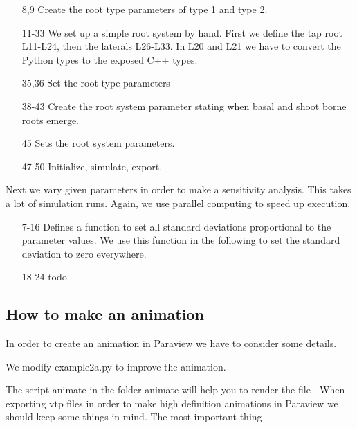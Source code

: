 \documentclass[a4paper]{article}
\begin{document}
\begin{itemize}

\item[8,9] Create the root type parameters of type 1 and type 2.
\item[11-33] We set up a simple root system by hand. First we define the tap root L11-L24, then the laterals L26-L33. In L20 and L21 we have to convert the Python types to the exposed C++ types.
\item[35,36] Set the root type parameters

\item[38-43] Create the root system parameter stating when basal and shoot borne roots emerge.

\item[45] Sets the root system parameters.

\item[47-50] Initialize, simulate, export. 

\end{itemize}

Next we vary given parameters in order to make a sensitivity analysis. This takes a lot of simulation runs. Again, we use parallel computing to speed up execution.



\begin{itemize}

\item[7-16] Defines a function to set all standard deviations proportional to the parameter values. We use this function in the following to set the standard deviation to zero everywhere. 

\item[18-24] todo

\end{itemize}



\subsection{How to make an animation}

In order to create an animation in Paraview we have to consider some details. 


We modify example2a.py to improve the animation.

The script animate in the folder animate will help you to render the file .
When exporting vtp files in order to make high definition animations in Paraview we should keep some things in mind. 
The most important thing
\end{document}
